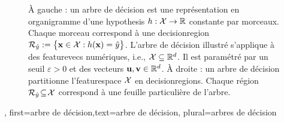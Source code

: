 {{\begin{figure}[H]
\begin{minipage}{.45\textwidth}
			\end{minipage}
			\caption{À gauche : un arbre de décision est une représentation en organigramme d’une \gls{hypothesis} $h : \mathcal{X} \rightarrow \mathbb{R}$ constante par morceaux. Chaque morceau correspond à une \gls{decisionregion} $\mathcal{R}_{\hat{y}} := \big\{ {\bf x} \in  \mathcal{X}: h({\bf x}) = \hat{y} \big\}$. 
				L’arbre de décision illustré s’applique à des \glspl{featurevec} numériques, i.e., $\mathcal{X} \subseteq \mathbb{R}^{d}$. Il est paramétré par un seuil $\varepsilon > 0$ et des vecteurs ${\bf u}, {\bf v} \in \mathbb{R}^{d}$. 
				À droite : un arbre de décision partitionne l’\gls{featurespace} $\mathcal{X}$ en \glspl{decisionregion}. Chaque région $\mathcal{R}_{\hat{y}} \!\subseteq\!\mathcal{X}$ correspond à une feuille particulière de l’arbre.}
			\label{fig_decision_tree}
		\end{figure}
	},
	first={arbre de décision},text={arbre de décision}, plural={arbres de décision}
}

